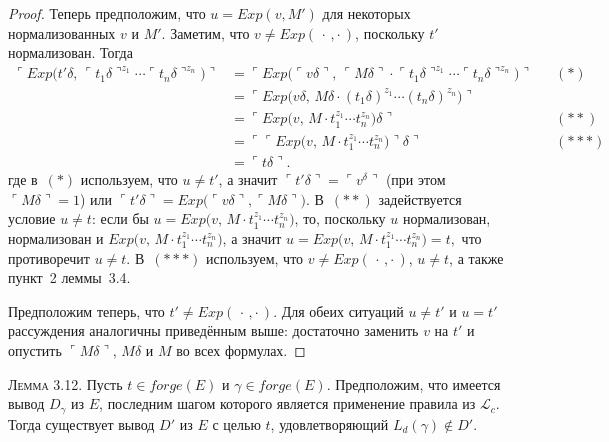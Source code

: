 \begin{proof}
Теперь предположим, что $u=Exp(v,M')$ для некоторых нормализованных
$v$ и $M'$.  Заметим, что $v\neq Exp(\,\cdot\,,\cdot\,)$, поскольку $t'$ нормализован. Тогда
\[
\begin{aligned}
\ulcorner Exp\!\bigl(t'\delta,\,
          \ulcorner t_1\delta\urcorner^{z_1}\!\cdots \ulcorner t_n\delta\urcorner^{z_n}\bigr)\urcorner
   &=\ulcorner Exp\!\bigl(\ulcorner v\delta\urcorner,\,
 \ulcorner M\delta\urcorner\!\cdot \ulcorner t_1\delta\urcorner^{z_1}\!\cdots \ulcorner t_n\delta\urcorner^{z_n}\bigr)\urcorner
     &&(\ast)\\
   &=\ulcorner Exp\!\bigl(v\delta,\,
          M\delta\!\cdot (t_1\delta)^{z_1}\!\cdots (t_n\delta)^{z_n}\bigr)\urcorner\\[4pt]
   &=\ulcorner Exp\!\bigl(v,\,
          M\!\cdot t_1^{z_1}\!\cdots t_n^{z_n}\bigr)\delta\urcorner
     &&(\ast\ast)\\
   &=\ulcorner\ulcorner Exp\!\bigl(v,\,
          M\!\cdot t_1^{z_1}\!\cdots t_n^{z_n}\bigr)\urcorner\delta\urcorner
     &&(\ast\ast\ast)\\
   &=\ulcorner t\delta\urcorner.
\end{aligned}
\]
где в~$(\ast)$ используем, что $u\neq t'$, а значит
$\ulcorner t'\delta\urcorner=\ulcorner v^{\delta}\urcorner$ (при этом $\ulcorner M\delta\urcorner=1$) \;или\;
$\ulcorner t'\delta\urcorner= Exp\!\bigl(\ulcorner v\delta\urcorner,\ulcorner M\delta\urcorner\bigr)$.
В~$(\ast\ast)$ задействуется условие $u\neq t$:
если бы $u= Exp\!\bigl(v,\,M\!\cdot t_1^{z_1}\!\cdots t_n^{z_n}\bigr)$,
то, поскольку $u$ нормализован, нормализован и
$ Exp\!\bigl(v,\,M\!\cdot t_1^{z_1}\!\cdots t_n^{z_n}\bigr)$,
а значит
\(
  u=Exp\!\bigl(v,\,M\!\cdot t_1^{z_1}\!\cdots t_n^{z_n}\bigr)=t,
\)
что противоречит $u\neq t$.
В~$(\ast\ast\ast)$ используем, что $v\neq Exp(\,\cdot\,,\cdot\,)$,
$u\neq t$, а также пункт~2 леммы~3.4.

\smallskip
Предположим теперь, что $t'\neq Exp(\,\cdot\,,\cdot\,)$.
Для обеих ситуаций $u\neq t'$ и $u=t'$ рассуждения
аналогичны приведённым выше:
достаточно заменить $v$ на $t'$ и опустить
$\ulcorner M\delta\urcorner$, $M\delta$ и $M$ во всех формулах.
\end{proof}

\textsc{Лемма 3.12.}
Пусть $t\in forge(E)$ и $\gamma\in forge(E)$.
Предположим, что имеется вывод $D_{\gamma}$ из $E$,
последним шагом которого является применение правила из $\mathcal L_{c}$.
Тогда существует вывод $D'$ из $E$ с целью $t$, удовлетворяющий
\(
  L_{d}(\gamma)\notin D'.
\)

